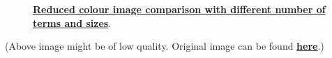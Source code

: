 		\begin{figure}[H]
			\centering
			\caption{\href{https://github.com/PeithonKing/comp_phys_P346/blob/main/static/crab_evolution.png}{\textbf{Reduced colour image comparison with different number of terms and sizes}}.}
			\label{fig:c_crab_evol}
		\end{figure}

		(Above image might be of low quality. Original image can be found \href{https://github.com/PeithonKing/comp_phys_P346/blob/main/static/crab_evolution.png}{\textbf{here}}.)

